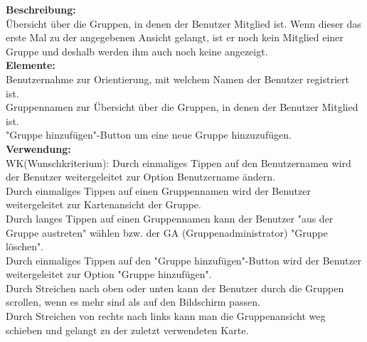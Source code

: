 

\textbf{Beschreibung:}\\
Übersicht über die Gruppen, in denen der Benutzer Mitglied ist. Wenn dieser das erste Mal zu der angegebenen Ansicht gelangt, ist er noch kein Mitglied einer Gruppe und deshalb werden ihm auch noch keine angezeigt.\\
\textbf{Elemente:}\\
Benutzernahme zur Orientierung, mit welchem Namen der Benutzer registriert ist.\\
Gruppennamen zur Übersicht über die Gruppen, in denen der Benutzer Mitglied ist.\\
"Gruppe hinzufügen"-Button um eine neue Gruppe hinzuzufügen.\\
\textbf{Verwendung:}\\
WK(Wunschkriterium): Durch einmaliges Tippen auf den Benutzernamen wird der Benutzer weitergeleitet zur Option Benutzername ändern.\\
Durch einmaliges Tippen auf einen Gruppennamen wird der Benutzer weitergeleitet zur Kartenansicht der Gruppe.\\
Durch langes Tippen auf einen Gruppennamen kann der Benutzer "aus der Gruppe austreten" wählen bzw. der GA (Gruppenadministrator) "Gruppe löschen".\\
Durch einmaliges Tippen auf den "Gruppe hinzufügen"-Button wird der Benutzer weitergeleitet zur Option "Gruppe hinzufügen".\\
Durch Streichen nach oben oder unten kann der Benutzer durch die Gruppen scrollen, wenn es mehr sind als auf den Bildschirm passen.\\
Durch Streichen von rechts nach links kann man die Gruppenansicht weg schieben und gelangt zu der zuletzt verwendeten Karte.
\clearpage
\newpage

